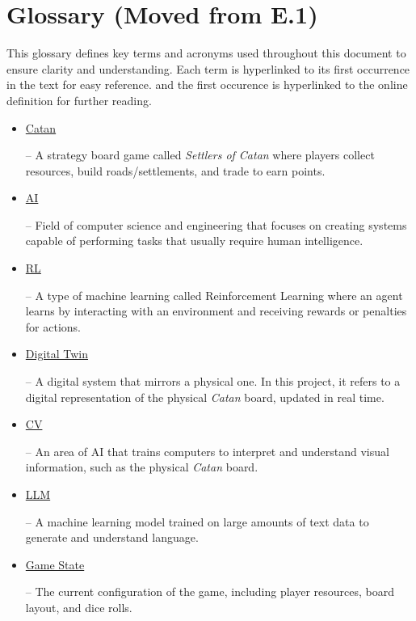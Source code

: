 \documentclass{article}
\newcommand{\CatanExt}{\href{https://en.wikipedia.org/wiki/Catan}{Catan}}
\newcommand{\AIExt}{\href{https://en.wikipedia.org/wiki/Artificial_intelligence}{AI}}
\newcommand{\RLExt}{\href{https://www.ibm.com/think/topics/reinforcement-learning}{RL}}
\newcommand{\DigitalTwinExt}{\href{https://en.wikipedia.org/wiki/Digital_twin}{Digital Twin}}
\newcommand{\CVExt}{\href{https://www.ibm.com/think/topics/computer-vision}{CV}}
\newcommand{\LLMExt}{\href{https://www.cloudflare.com/learning/ai/what-is-large-language-model/}{LLM}}
\newcommand{\GameStateExt}{\href{https://milvus.io/ai-quick-reference/what-is-a-state-in-rl}{Game State}}
\begin{document}
\medskip

\hypertarget{glossary-catan}{}
\hypertarget{glossary-ai}{}
\hypertarget{glossary-rl}{}
\hypertarget{glossary-dt}{}
\hypertarget{glossary-cv}{}
\hypertarget{glossary-llm}{}
\hypertarget{glossary-gamestate}{}

\newcommand{\Catan}{\hyperlink{glossary-catan}{Catan}}
\newcommand{\AI}{\hyperlink{glossary-ai}{AI}}
\newcommand{\RL}{\hyperlink{glossary-rl}{RL}}
\newcommand{\DigitalTwin}{\hyperlink{glossary-dt}{Digital Twin}}
\newcommand{\CV}{\hyperlink{glossary-cv}{CV}}
\newcommand{\LLM}{\hyperlink{glossary-llm}{LLM}}
\newcommand{\GameState}{\hyperlink{glossary-gamestate}{Game State}}

\section*{Glossary (Moved from E.1)}
\raggedright This glossary defines key terms and acronyms used throughout this document to ensure clarity and understanding. Each term is hyperlinked to its first occurrence in the text for easy reference. 
and the first occurence is hyperlinked to the online definition for further reading.
\begin{itemize}
    \item \hypertarget{glossary-catan}{\CatanExt{}} – A strategy board game called \textit{Settlers of Catan} where players collect resources, build roads/settlements, and trade to earn points.
    \item \hypertarget{glossary-ai}{\AIExt{}} – Field of computer science and engineering that focuses on creating systems capable of performing tasks that usually require human intelligence.
    \item \hypertarget{glossary-rl}{\RLExt{}} – A type of machine learning called Reinforcement Learning where an agent learns by interacting with an environment and receiving rewards or penalties for actions.
    \item \hypertarget{glossary-dt}{\DigitalTwinExt{}} – A digital system that mirrors a physical one. In this project, it refers to a digital representation of the physical \emph{Catan} board, updated in real time.
    \item \hypertarget{glossary-cv}{\CVExt{}} – An area of AI that trains computers to interpret and understand visual information, such as the physical \emph{Catan} board.
    \item \hypertarget{glossary-llm}{\LLMExt{}} – A machine learning model trained on large amounts of text data to generate and understand language.
    \item \hypertarget{glossary-gamestate}{\GameStateExt{}} – The current configuration of the game, including player resources, board layout, and dice rolls.
\end{itemize}
\end{document}

